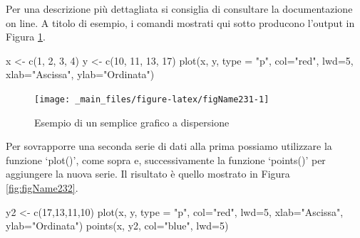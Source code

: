 \documentclass[a4paper,12pt,oneside]{book}
\newenvironment{Shaded}{\begin{snugshade}}{\end{snugshade}}
\newcommand{\DecValTok}[1]{#1}
\newcommand{\StringTok}[1]{#1}
\newcommand{\OtherTok}[1]{#1}
\newcommand{\FunctionTok}[1]{#1}
\newcommand{\AttributeTok}[1]{#1}
\newcommand{\NormalTok}[1]{#1}
\begin{document}
Per una descrizione più dettagliata si consiglia di consultare la documentazione on line. A titolo di esempio, i comandi mostrati qui sotto producono l'output in Figura \ref{fig:figName231}.

\begin{Shaded}
\begin{Highlighting}[]
\NormalTok{x  }\OtherTok{\textless{}{-}}  \FunctionTok{c}\NormalTok{(}\DecValTok{1}\NormalTok{, }\DecValTok{2}\NormalTok{, }\DecValTok{3}\NormalTok{, }\DecValTok{4}\NormalTok{)}
\NormalTok{y  }\OtherTok{\textless{}{-}}  \FunctionTok{c}\NormalTok{(}\DecValTok{10}\NormalTok{, }\DecValTok{11}\NormalTok{, }\DecValTok{13}\NormalTok{, }\DecValTok{17}\NormalTok{)}
\FunctionTok{plot}\NormalTok{(x, y, }\AttributeTok{type =} \StringTok{"p"}\NormalTok{, }\AttributeTok{col=}\StringTok{"red"}\NormalTok{, }\AttributeTok{lwd=}\DecValTok{5}\NormalTok{, }\AttributeTok{xlab=}\StringTok{"Ascissa"}\NormalTok{, }\AttributeTok{ylab=}\StringTok{"Ordinata"}\NormalTok{)}
\end{Highlighting}
\end{Shaded}

\begin{figure}

{\centering \texttt{[image: \_main\_files/figure-latex/figName231-1]} 

}

\caption{Esempio di un semplice grafico a dispersione}\label{fig:figName231}
\end{figure}

Per sovrapporre una seconda serie di dati alla prima possiamo utilizzare la funzione `plot()', come sopra e, successivamente la funzione `points()' per aggiungere la nuova serie. Il risultato è quello mostrato in Figura \ref{fig:figName232}.

\begin{Shaded}
\begin{Highlighting}[]
\NormalTok{y2  }\OtherTok{\textless{}{-}}  \FunctionTok{c}\NormalTok{(}\DecValTok{17}\NormalTok{,}\DecValTok{13}\NormalTok{,}\DecValTok{11}\NormalTok{,}\DecValTok{10}\NormalTok{)}
\FunctionTok{plot}\NormalTok{(x, y, }\AttributeTok{type =} \StringTok{"p"}\NormalTok{, }\AttributeTok{col=}\StringTok{"red"}\NormalTok{, }\AttributeTok{lwd=}\DecValTok{5}\NormalTok{, }\AttributeTok{xlab=}\StringTok{"Ascissa"}\NormalTok{, }\AttributeTok{ylab=}\StringTok{"Ordinata"}\NormalTok{)}
\FunctionTok{points}\NormalTok{(x, y2, }\AttributeTok{col=}\StringTok{"blue"}\NormalTok{, }\AttributeTok{lwd=}\DecValTok{5}\NormalTok{)}
\end{Highlighting}
\end{Shaded}
\end{document}
